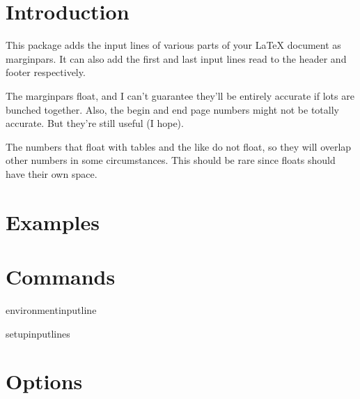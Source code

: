 \documentclass{scrartcl}
\begin{document}
\section{Introduction}
This package adds the input lines of various parts of your LaTeX
document as marginpars.
It can also add the first and last input lines read to the header and
footer respectively.

The marginpars float, and I can't guarantee they'll be entirely
accurate if lots are bunched together.
Also, the begin and end page numbers might not be totally accurate.
But they're still useful (I hope).

The numbers that float with tables and the like do not float, so they
will overlap other numbers in some circumstances.
This should be rare since floats should have their own space.

\section{Examples}



\section{Commands}

environmentinputline

setupinputlines

\section{Options}
\end{document}
